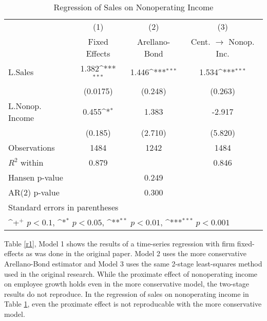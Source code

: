 \begin{table}[htbp]\centering \caption{Regression of Sales on Nonoperating Income\label{r2}}
{
\def\sym#1{\ifmmode^{#1}\else\(^{#1}\)\fi}
\begin{tabular}{l*{3}{c}}
\hline\hline
                    &\multicolumn{1}{c}{(1)}&\multicolumn{1}{c}{(2)}&\multicolumn{1}{c}{(3)}\\
                    &\multicolumn{1}{c}{Fixed Effects}&\multicolumn{1}{c}{Arellano-Bond}&\multicolumn{1}{c}{Cent. $\rightarrow$ Nonop. Inc.}\\
\hline
L.Sales             &       1.382\sym{***}&       1.446\sym{***}&       1.534\sym{***}\\
                    &    (0.0175)         &     (0.248)         &     (0.263)         \\
L.Nonop. Income     &       0.455\sym{*}  &       1.383         &      -2.917         \\
                    &     (0.185)         &     (2.710)         &     (5.820)         \\
\hline
Observations        &        1484         &        1242         &        1484         \\
$R^2$ within                &       0.879         &                     &       0.846         \\
Hansen p-value             &                     &       0.249         &                     \\
AR(2) p-value                &                     &       0.300         &                     \\
\hline\hline
\multicolumn{4}{l}{\footnotesize Standard errors in parentheses}\\
\multicolumn{4}{l}{\footnotesize \sym{+} \(p<0.1\), \sym{*} \(p<0.05\), \sym{**} \(p<0.01\), \sym{***} \(p<0.001\)}\\
\end{tabular}
}
\end{table}

Table \ref{r1}, Model 1 shows the results of a time-series regression with firm fixed-effects as was done in the original paper. Model 2 uses the more conservative Arellano-Bond estimator and Model 3 uses the same 2-stage least-squares method used in the original research. While the proximate effect of nonoperating income on employee growth holds even in the more conservative model, the two-stage results do not reproduce. In the regression of sales on nonoperating income in Table \ref{r2}, even the proximate effect is not reproducable with the more conservative model.


